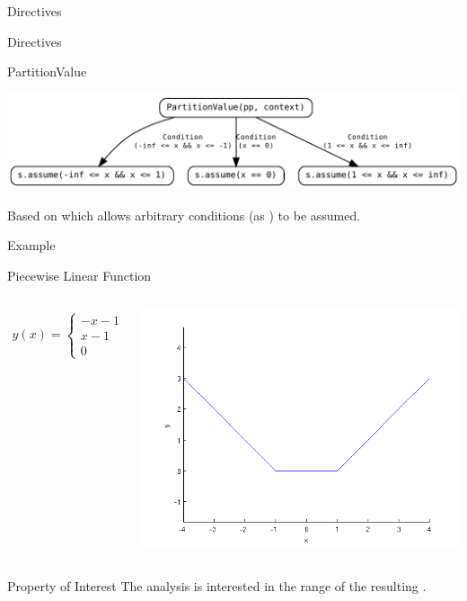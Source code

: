 \documentclass{beamer}
\begin{document}
\begin{section}{Directives}
\begin{frame}[t]{Directives}
\begin{block}{PartitionValue}
			\begin{center}
				\includegraphics[width=\textwidth]{Graphs/PartitionValue.pdf}
			\end{center}
			
			Based on  which allows arbitrary conditions (as ) to be assumed.
		\end{block}
	\end{frame}


	\begin{frame}[t]{Example}
		\begin{block}{Piecewise Linear Function}
			\begin{columns}
				\begin{column}{4cm}
					\begin{align*}
						y(x) =
							\begin{cases}
								-x - 1 & \text{if } x < -1\\
								x - 1 & \text{if } x > 1\\
								0 & \text{otherwise}
							\end{cases}
					\end{align*}
				\end{column}
				\begin{column}{5cm}
					\includegraphics[scale=0.4]{Plots/valueExample.png}
				\end{column}
			\end{columns}
		\end{block}
		\begin{block}{Property of Interest}
			The analysis is interested in the range of the resulting .
		\end{block}
	\end{frame}


\end{section}
\end{document}
